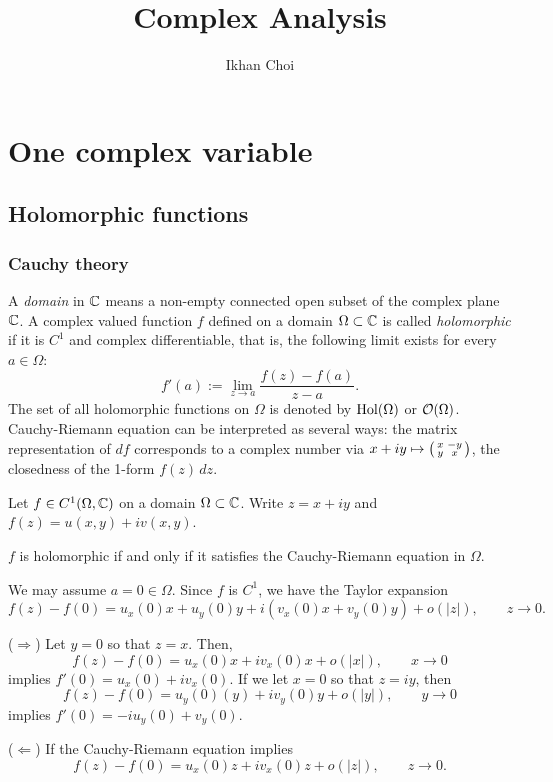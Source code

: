 \documentclass{../../large}
\begin{document}
\title{Complex Analysis}
\author{Ikhan Choi}
\maketitle
\tableofcontents


\part{One complex variable}


\chapter{Holomorphic functions}
\section{Cauchy theory}

\begin{prb}
A \emph{domain} in $\C$ means a non-empty connected open subset of the complex plane $\C$.
A complex valued function $f$ defined on a domain $\Omega\subset\C$ is called \emph{holomorphic} if it is $C^1$ and complex differentiable, that is, the following limit exists for every $a\in\Omega$:
\[f'(a):=\lim_{z\to a}\frac{f(z)-f(a)}{z-a}.\]
The set of all holomorphic functions on $\Omega$ is denoted by $\Hol(\Omega)$ or $\cO(\Omega)$.
Cauchy-Riemann equation can be interpreted as several ways: the matrix representation of $df$ corresponds to a complex number via $x+iy\mapsto\left(\mat[small]{x&-y\\y&x}\right)$, the closedness of the 1-form $f(z)\,dz$.

Let $f\in C^1(\Omega,\C)$ on a domain $\Omega\subset\C$.
Write $z=x+iy$ and $f(z)=u(x,y)+iv(x,y)$.
\begin{parts}
\item $f$ is holomorphic if and only if it satisfies the Cauchy-Riemann equation in $\Omega$.
\end{parts}
\end{prb}
\begin{pf}
We may assume $a=0\in\Omega$.
Since $f$ is $C^1$, we have the Taylor expansion
\[f(z)-f(0)=u_x(0)x+u_y(0)y+i(v_x(0)x+v_y(0)y)+o(|z|),\qquad z\to0.\]

($\Rightarrow$)
Let $y=0$ so that $z=x$.
Then,
\[f(z)-f(0)=u_x(0)x+iv_x(0)x+o(|x|),\qquad x\to0\]
implies $f'(0)=u_x(0)+iv_x(0)$.
If we let $x=0$ so that $z=iy$, then
\[f(z)-f(0)=u_y(0)(y)+iv_y(0)y+o(|y|),\qquad y\to0\]
implies $f'(0)=-iu_y(0)+v_y(0)$.


($\Leftarrow$)
If the Cauchy-Riemann equation implies
\[f(z)-f(0)=u_x(0)z+iv_x(0)z+o(|z|),\qquad z\to0.\]
\end{pf}
\end{document}
